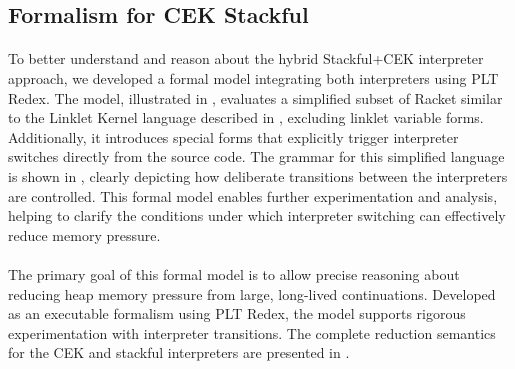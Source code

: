 
    \subsection{Formalism for CEK \+ Stackful}


      \paragraph{}%
        To better understand and reason about the hybrid Stackful+CEK interpreter approach, we developed a formal model integrating both interpreters using PLT Redex. The model, illustrated in , evaluates a simplified subset of Racket similar to the Linklet Kernel language described in , excluding linklet variable forms. Additionally, it introduces special  forms that explicitly trigger interpreter switches directly from the source code. The grammar for this simplified language is shown in , clearly depicting how deliberate transitions between the interpreters are controlled. This formal model enables further experimentation and analysis, helping to clarify the conditions under which interpreter switching can effectively reduce memory pressure.

      \paragraph{}%
        The primary goal of this formal model is to allow precise reasoning about reducing heap memory pressure from large, long-lived continuations. Developed as an executable formalism using PLT Redex, the model supports rigorous experimentation with interpreter transitions. The complete reduction semantics for the CEK and stackful interpreters are presented in .


